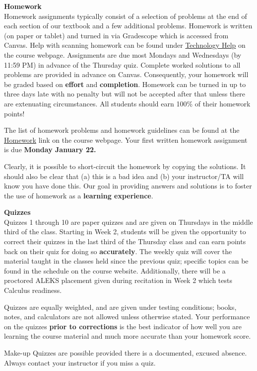 \documentclass[12pt]{article}
\renewcommand{\emph}[1]{\textsf{\textbf{#1}}}
\newcommand{\localhead}[1]{\par\smallskip\textbf{#1}\nobreak\\}%
\def\heading#1{\localhead{\large\emph{#1}}}
\begin{document}
\heading{Homework}
Homework assignments typically consist of a selection of problems at the end of each section of our textbook and a few additional problems. Homework is written (on paper or tablet) and turned in via Gradescope which is accessed from Canvas.  Help with scanning homework can be found under \href{https://uaf-math251.github.io/techHelp.html}{Technology Help} on the course webpage. Assignments are due most Mondays and Wednesdays (by 11:59 PM) in advance of the Thursday quiz. Complete worked solutions to all problems are provided in advance on Canvas. Consequently, your homework will be graded based on \emph{effort} and \emph{completion}. Homework can be turned in up to three days late with no penalty but will not be accepted after that unless there are extenuating circumstances. All students should earn 100\% of their homework points!

The list of homework problems and homework guidelines can be found at the \href{https://uaf-math251.github.io/newhomework.html}{Homework} link on the course webpage. Your first written homework assignment is due \emph{Monday January 22.}

Clearly, it is possible to short-circuit the homework by copying the solutions. It should also be clear that (a) this is a bad idea and (b) your instructor/TA will know you have done this. Our goal in providing answers and solutions is to foster the use of homework as a \emph{learning experience}. 



\heading{Quizzes}
Quizzes 1 through 10 are paper quizzes and are given on Thursdays in the middle third of the class. Starting in Week 2, students will be given the opportunity to correct their quizzes in the last third of the Thursday class and can earn points back on their quiz for doing so \emph{accurately}. The weekly quiz will cover the material taught in the classes held since the previous quiz; specific topics can be found in the schedule on the course website. Additionally, there will be a proctored ALEKS placement given during recitation in Week 2 which tests Calculus readiness.

Quizzes are equally weighted, and are given under testing conditions; books, notes, and calculators are not allowed unless otherwise stated. Your performance on the quizzes \emph{prior to corrections} is the best indicator of how well you are learning the course material and much more accurate than your homework score.

Make-up Quizzes are possible provided there is a documented, excused absence. Always contact your instructor if you miss a quiz.
\end{document}

